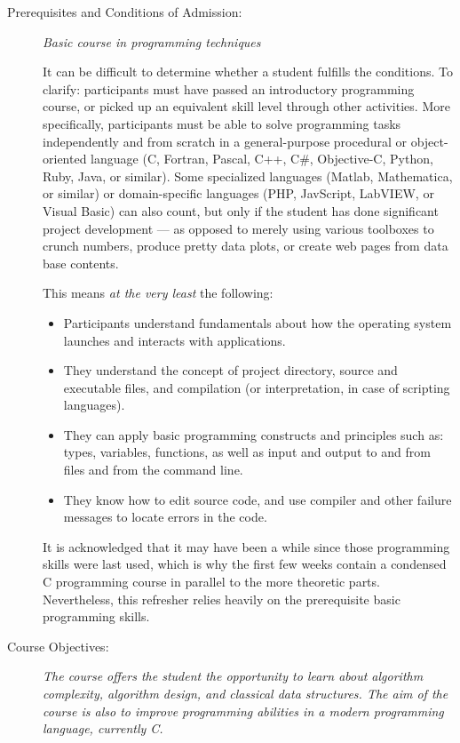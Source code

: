 \documentclass[a4paper]{article}
\begin{document}
\begin{description}

\item[Prerequisites and Conditions of Admission:]
  \emph{Basic course in programming techniques}

  It can be difficult to determine whether a student fulfills the conditions.
  To clarify: participants must have passed an introductory programming course, or picked up an equivalent skill level through other activities.
  More specifically, participants must be able to solve programming tasks independently and from scratch in a general-purpose procedural or object-oriented language (C, Fortran, Pascal, C++, C\#, Objective-C, Python, Ruby, Java, or similar).
  Some specialized languages (Matlab, Mathematica, or similar) or domain-specific languages (PHP, JavScript, LabVIEW, or Visual Basic) can also count, but only if the student has done significant project development --- as opposed to merely using various toolboxes to crunch numbers, produce pretty data plots, or create web pages from data base contents.

  This means \emph{at the very least} the following:
  
  \begin{itemize}
  \item Participants understand fundamentals about how the operating system launches and interacts with applications.
  \item They understand the concept of project directory, source and executable files, and compilation (or interpretation, in case of scripting languages).
  \item They can apply basic programming constructs and principles such as: types, variables, functions, as well as input and output to and from files and from the command line.
  \item They know how to edit source code, and use compiler and other failure messages to locate errors in the code.
  \end{itemize}
  
  It is acknowledged that it may have been a while since those programming skills were last used, which is why the first few weeks contain a condensed C programming course in parallel to the more theoretic parts.
  Nevertheless, this refresher relies heavily on the prerequisite basic programming skills.

\item[Course Objectives:]
  \emph{
    The course offers the student the opportunity to learn about algorithm complexity, algorithm design, and classical data structures.
    The aim of the course is also to improve programming abilities in a modern programming language, currently C.
  }
  

\end{description}
\end{document}

